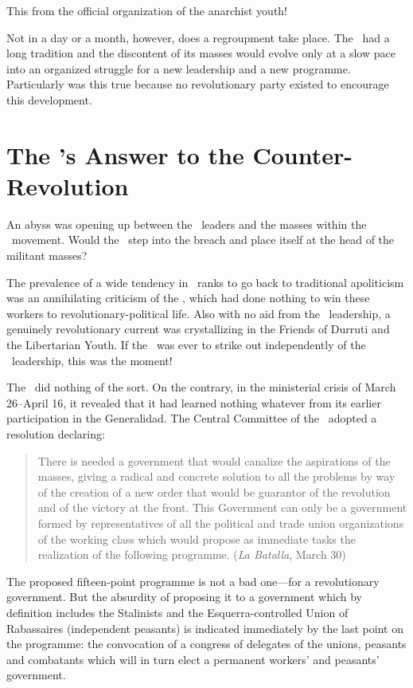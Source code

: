 This from the official organization of the anarchist youth!

Not in a day or a month, however, does a regroupment take place. The \CNT\ had a long tradition and the discontent of its masses would evolve only at a slow pace into an organized struggle for a new leadership and a new programme. Particularly was this true because no revolutionary party existed to encourage this development.

\section*{The \POUM’s Answer to the Counter-Revolution}

An abyss was opening up between the \CNT\ leaders and the masses within the \CNT\ movement. Would the \POUM\ step into the breach and place itself at the head of the militant masses?

The prevalence of a wide tendency in \CNT\ ranks to go back to traditional apoliticism was an annihilating criticism of the \POUM, which had done nothing to win these workers to revolutionary-political life. Also with no aid from the \POUM\ leadership, a genuinely revolutionary current was crystallizing in the Friends of Durruti and the Libertarian Youth. If the \POUM\ was ever to strike out independently of the \CNT\ leadership, this was the moment!

The \POUM\ did nothing of the sort. On the contrary, in the ministerial crisis of March 26--April 16, it revealed that it had learned nothing whatever from its earlier participation in the Generalidad. The Central Committee of the \POUM\ adopted a resolution declaring:

\begin{quotation}
  There is needed a government that would canalize the aspirations of the masses, giving a radical and concrete solution to all the problems by way of the creation of a new order that would be guarantor of the revolution and of the victory at the front. This Government can only be a government formed by representatives of all the political and trade union organizations of the working class which would propose as immediate tasks the realization of the following programme. (\emph{La Batalla}, March 30)
\end{quotation}

The proposed fifteen-point programme is not a bad one---for a revolutionary government. But the absurdity of proposing it to a government which by definition includes the Stalinists and the Esquerra-controlled Union of Rabassaires (independent peasants) is indicated immediately by the last point on the programme: the convocation of a congress of delegates of the unions, peasants and combatants which will in turn elect a permanent workers’ and peasants’ government.

